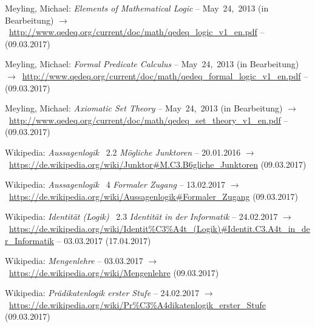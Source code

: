 \documentclass[english,ngerman,parskip=half,headsepline,footsepline,
	fleqn,notitlepage]{scrreprt}
\newcommand*{\tourl}[1]{$\rightarrow$~\url{#1}}
\begin{document}
\begin{flushleft}
\begin{thebibliography}{12}
			Meyling, Michael:
			\emph{Elements of Mathematical Logic}
			-- May~24,~2013 (in Bearbeitung)
			\tourl{http://www.qedeq.org/current/doc/math/qedeq_logic_v1_en.pdf}
			-- (09.03.2017)

			Meyling, Michael:
			\emph{Formal Predicate Calculus}
			-- May~24,~2013 (in Bearbeitung)
			\tourl{http://www.qedeq.org/current/doc/math/qedeq_formal_logic_v1_en.pdf}
			-- (09.03.2017)

			Meyling, Michael:
			\emph{Axiomatic Set Theory}
			-- May~24,~2013 (in Bearbeitung)
			\tourl{http://www.qedeq.org/current/doc/math/qedeq_set_theory_v1_en.pdf}
			-- (09.03.2017)

			Wikipedia:
			\emph{Aussagenlogik} \chaptername~2.2 \emph{Mögliche Junktoren}
			-- 20.01.2016
			\tourl{https://de.wikipedia.org/wiki/Junktor\#M.C3.B6gliche_Junktoren}
			(09.03.2017)

			Wikipedia:
			\emph{Aussagenlogik} \chaptername~4 \emph{Formaler Zugang}
			-- 13.02.2017
			\tourl{https://de.wikipedia.org/wiki/Aussagenlogik\#Formaler_Zugang}
			(09.03.2017)

			Wikipedia:
			\emph{Identität (Logik)} \chaptername~2.3
			\emph{Identität in der Informatik}
			-- 24.02.2017
			\tourl{https://de.wikipedia.org/wiki/Identit\%C3\%A4t_(Logik)\#Identit.C3.A4t_in_der_Informatik}
			-- 03.03.2017 (17.04.2017)

			Wikipedia:
			\emph{Mengenlehre}
			-- 03.03.2017
			\tourl{https://de.wikipedia.org/wiki/Mengenlehre}
			(09.03.2017)

			Wikipedia:
			\emph{Prädikatenlogik erster Stufe}
			-- 24.02.2017
			\tourl{https://de.wikipedia.org/wiki/Pr\%C3\%A4dikatenlogik_erster_Stufe}
			(09.03.2017)

		\end{thebibliography}
	\end{flushleft}

%
\end{document}
